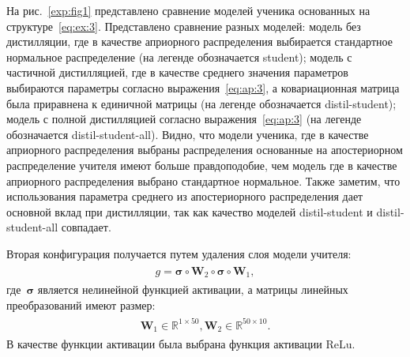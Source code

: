 \documentclass[12pt]{a&t}
\begin{document}
На рис.~\ref{exp:fig1} представлено сравнение моделей ученика основанных на структуре~\eqref{eq:ex:3}. Представлено сравнение разных моделей: модель без дистилляции, где в качестве априорного распределения выбирается стандартное нормальное распределение (на легенде обозначается student); модель с частичной дистилляцией, где в качестве среднего значения параметров выбираются параметры согласно выражения~\eqref{eq:ap:3}, а ковариационная матрица была приравнена к единичной матрицы (на легенде обозначается distil-student); модель с полной дистилляцией согласно выражения~\eqref{eq:ap:3} (на легенде обозначается distil-student-all). Видно, что модели ученика, где в качестве априорного распределения выбраны распределения основанные на апостериорном распределение учителя имеют больше правдоподобие, чем модель где в качестве априорного распределения выбрано стандартное нормальное. Также заметим, что использования параметра среднего из апостериорного распределения дает основной вклад при дистилляции, так как качество моделей distil-student и distil-student-all совпадает.

Вторая конфигурация получается путем удаления слоя модели учителя:
\begin{gather}
\label{eq:ex:5}
\begin{aligned}
g = \bm{\sigma} \circ \mathbf{W}_2 \circ \bm{\sigma} \circ \mathbf{W}_1,
\end{aligned}
\end{gather}
где~$\bm{\sigma}$ является нелинейной функцией активации, а матрицы линейных преобразований имеют размер:
\begin{gather}
\label{eq:ex:6}
\begin{aligned}
\mathbf{W}_{1} \in \mathbb{R}^{1 \times 50}, \mathbf{W}_{2} \in \mathbb{R}^{50 \times 10}.
\end{aligned}
\end{gather}
 В качестве функции активации была выбрана функция активации $\text{ReLu}$.
\end{document}
